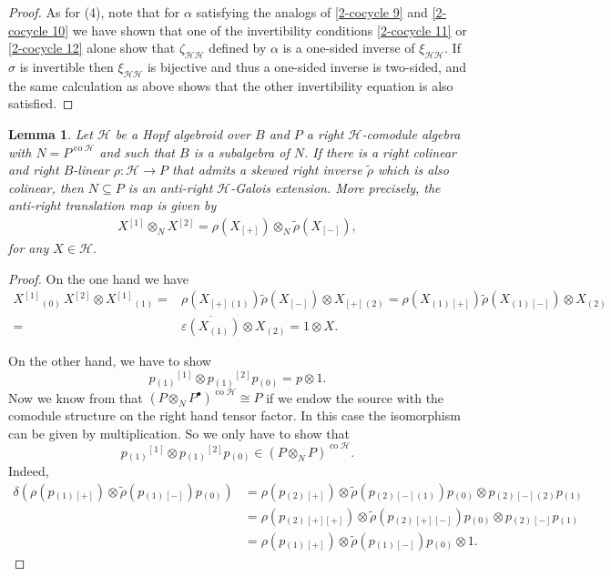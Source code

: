 \documentclass[a4paper,reqno]{amsart}
\numberwithin{equation}{section}
\theoremstyle{plain}
\newtheorem{lem}[thm]{Lemma}
\theoremstyle{remark}
\numberwithin{equation}{section}
\newcommand{\ot}{\otimes}
\newcommand{\yi}[1]{{#1}{}{}^{\scriptscriptstyle{[1]}}}
\newcommand{\er}[1]{{#1}{}{}^{\scriptscriptstyle{[2]}}}
\newcommand{\trho}{{\tilde{\rho}}}
\newcommand{\z}{{}_{\scriptscriptstyle{(0)}}}
\renewcommand{\o}{{}_{\scriptscriptstyle{(1)}}}
\renewcommand{\t}{{}_{\scriptscriptstyle{(2)}}}
\newcommand\ou[1]{\otimes_{#1}}
\newcommand{\CH}{\mathcal{H}}
\newcommand\co{{\operatorname{co}}}
\begin{document}
\begin{proof}
As for (4), note that for $\alpha$ satisfying the analogs of \eqref{2-cocycle 9} and \eqref{2-cocycle 10} we have shown that one of the invertibility conditions \eqref{2-cocycle 11} or \eqref{2-cocycle 12} alone show that $\zeta_{\CH\CH}$ defined by $\alpha$ is a one-sided inverse of $\xi_{\CH\CH}.$ If $\sigma$ is invertible then $\xi_{\CH\CH}$ is bijective and thus a one-sided inverse is two-sided, and the same calculation as above shows that the other invertibility equation is also satisfied.
\end{proof}

\begin{lem}\label{lem. even half anti cleft extension is Galois}
   Let $\CH$
be a Hopf algebroid over $B$ and $P$ a right $\CH$-comodule algebra with $N=P^{\co\CH}$ and such that $B$ is a subalgebra of $N$. If there is a right colinear and right $B$-linear $\rho\colon\CH\to P$ that admits a skewed right inverse $\tilde\rho$ which is also colinear, then $N\subseteq P$ is an anti-right $\CH$-Galois extension. More precisely, the anti-right translation map is given by
    \begin{align}
        X\yi{}\ot_{N}X\er{}=\rho(X_{[+]})\ot_{N}\trho(X_{[-]}),
    \end{align}
    for any $X\in \CH$.
\end{lem}
\begin{proof}
    On the one hand we have
    \begin{align*}
        X\yi{}\z\,X\er{}\ot  X\yi{}\o=&\rho(X_{[+]}\o)\trho(X_{[-]})\ot X_{[+]}\t
        =\rho(X\o{}_{[+]})\trho(X\o{}_{[-]})\ot X\t\\
        =&\overline{\varepsilon(X\o)}\ot X\t=1\ot X.
    \end{align*}
    
  On the other hand, we have to show
    \[p\o\yi{}\ot p\o\er{} p\z =p\ot 1.\]
    Now we know from  that $(P\ou NP^{\bullet})^{\co\CH}\cong P$  if we endow the source with the comodule structure on the right hand tensor factor. In this case the isomorphism can be given by multiplication. So we only have to show that 
    \[p\o\yi{}\ot p\o\er{} p\z \in (P\ot_{N}P)^{\co\CH}.\]
     Indeed,
    \begin{align*}
        \delta(\rho(p\o{}_{[+]})\ot\trho(p\o{}_{[-]})p\z)
        &=\rho(p\t{}_{[+]})\ot\trho(p\t{}_{[-]}\o)p\z\ot p\t{}_{[-]}\t p\o\\
        &=\rho(p\t{}_{[+][+]})\ot\trho(p\t{}_{[+][-]})p\z\ot p\t{}_{[-]}p\o\\
        &=\rho(p\o{}_{[+]})\ot\trho(p\o{}_{[-]})p\z\ot 1.
    \end{align*}  
\end{proof}
\end{document}
